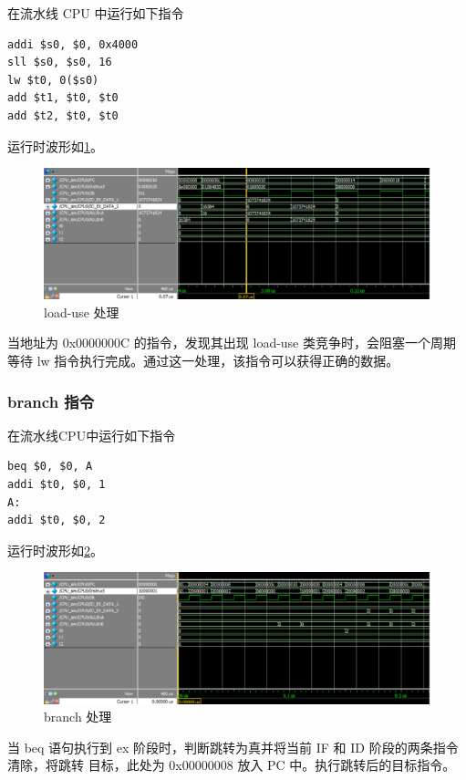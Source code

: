 \documentclass{ctexart}
\begin{document}
	在流水线 CPU 中运行如下指令

	\begin{lstlisting}
addi $s0, $0, 0x4000
sll $s0, $s0, 16
lw $t0, 0($s0)
add $t1, $t0, $t0
add $t2, $t0, $t0	
	\end{lstlisting}
	
运行时波形如\ref{simpicture9}。

	\begin{figure}[ht]
		\centering
		\includegraphics[width = \textwidth]{PipelineTestWave2.eps}
		\caption{ load-use 处理}
		\label{simpicture9}
	\end{figure}

当地址为 0x0000000C 的指令，发现其出现 load-use 类竞争时，会阻塞一个周期等待 lw 指令执行完成。通过这一处理，该指令可以获得正确的数据。

	\subsubsection{branch 指令}

	在流水线CPU中运行如下指令
	\begin{lstlisting}
beq $0, $0, A
addi $t0, $0, 1
A:
addi $t0, $0, 2
	\end{lstlisting}

	运行时波形如\ref{simpicture10}。

	\begin{figure}[ht]
		\centering
		\includegraphics[width = \textwidth]{PipelineTestWave3.eps}
		\caption{branch 处理}
		\label{simpicture10}
	\end{figure}
	当 beq 语句执行到 ex 阶段时，判断跳转为真并将当前 IF 和 ID 阶段的两条指令清除，将跳转
目标，此处为 0x00000008 放入 PC 中。执行跳转后的目标指令。
\end{document}
